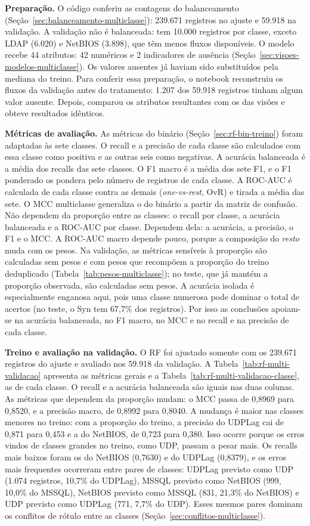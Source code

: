 \documentclass[
    12pt,                %
    openright,           %
    oneside,             %
    a4paper,             %
    english,             %
    brazil               %
]{abntex2}
\begin{document}
\textbf{Preparação.} O código conferiu as contagens do balanceamento (Seção~\ref{sec:balanceamento-multiclasse}): 239.671 registros no ajuste e 59.918 na validação. A validação não é balanceada: tem 10.000 registros por classe, exceto LDAP (6.020) e NetBIOS (3.898), que têm menos fluxos disponíveis. O modelo recebe 44 atributos: 42 numéricos e 2 indicadores de ausência (Seção~\ref{sec:visoes-modelos-multiclasse}). Os valores ausentes já haviam sido substituídos pela mediana do treino. Para conferir essa preparação, o notebook reconstruiu os fluxos da validação antes do tratamento: 1.207 dos 59.918 registros tinham algum valor ausente. Depois, comparou os atributos resultantes com os das visões e obteve resultados idênticos.
 
\textbf{Métricas de avaliação.} As métricas do binário (Seção~\ref{sec:rf-bin-treino}) foram adaptadas às sete classes. O recall e a precisão de cada classe são calculados com essa classe como positiva e as outras seis como negativas. A acurácia balanceada é a média dos recalls das sete classes. O F1 macro é a média dos sete F1, e o F1 ponderado os pondera pelo número de registros de cada classe. A ROC-AUC é calculada de cada classe contra as demais (\textit{one-vs-rest}, OvR) e tirada a média das sete. O MCC multiclasse generaliza o do binário a partir da matriz de confusão. Não dependem da proporção entre as classes: o recall por classe, a acurácia balanceada e a ROC-AUC por classe. Dependem dela: a acurácia, a precisão, o F1 e o MCC. A ROC-AUC macro depende pouco, porque a composição do \textit{resto} muda com os pesos. Na validação, as métricas sensíveis à proporção são calculadas sem pesos e com pesos que recompõem a proporção do treino deduplicado (Tabela~\ref{tab:pesos-multiclasse}); no teste, que já mantém a proporção observada, são calculadas sem pesos. A acurácia isolada é especialmente enganosa aqui, pois uma classe numerosa pode dominar o total de acertos (no teste, o Syn tem 67,7\% dos registros). Por isso as conclusões apoiam-se na acurácia balanceada, no F1 macro, no MCC e no recall e na precisão de cada classe.
 
\textbf{Treino e avaliação na validação.} O RF foi ajustado somente com os 239.671 registros do ajuste e avaliado nos 59.918 da validação. A Tabela~\ref{tab:rf-multi-validacao} apresenta as métricas gerais e a Tabela~\ref{tab:rf-multi-validacao-classe}, as de cada classe. O recall e a acurácia balanceada são iguais nas duas colunas. As métricas que dependem da proporção mudam: o MCC passa de 0,8969 para 0,8520, e a precisão macro, de 0,8992 para 0,8040. A mudança é maior nas classes menores no treino: com a proporção do treino, a precisão do UDPLag cai de 0,871 para 0,453 e a do NetBIOS, de 0,723 para 0,380. Isso ocorre porque os erros vindos de classes grandes no treino, como UDP, passam a pesar mais. Os recalls mais baixos foram os do NetBIOS (0,7630) e do UDPLag (0,8379), e os erros mais frequentes ocorreram entre pares de classes: UDPLag previsto como UDP (1.074 registros, 10,7\% do UDPLag), MSSQL previsto como NetBIOS (999, 10,0\% do MSSQL), NetBIOS previsto como MSSQL (831, 21,3\% do NetBIOS) e UDP previsto como UDPLag (771, 7,7\% do UDP). Esses mesmos pares dominam os conflitos de rótulo entre as classes (Seção~\ref{sec:conflitos-multiclasse}).
 
\end{document}
